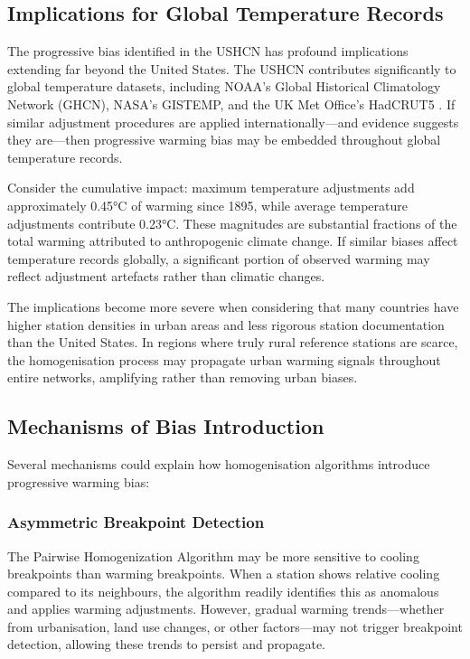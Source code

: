 \documentclass[11pt, a4paper]{article}
\begin{document}
\subsection{Implications for Global Temperature Records}

The progressive bias identified in the USHCN has profound implications extending far beyond the United States. The USHCN contributes significantly to global temperature datasets, including NOAA's Global Historical Climatology Network (GHCN), NASA's GISTEMP, and the UK Met Office's HadCRUT5 \parencite{lenssen2019improvements,morice2021updated}. If similar adjustment procedures are applied internationally—and evidence suggests they are—then progressive warming bias may be embedded throughout global temperature records.

Consider the cumulative impact: maximum temperature adjustments add approximately 0.45°C of warming since 1895, while average temperature adjustments contribute 0.23°C. These magnitudes are substantial fractions of the total warming attributed to anthropogenic climate change. If similar biases affect temperature records globally, a significant portion of observed warming may reflect adjustment artefacts rather than climatic changes.

The implications become more severe when considering that many countries have higher station densities in urban areas and less rigorous station documentation than the United States. In regions where truly rural reference stations are scarce, the homogenisation process may propagate urban warming signals throughout entire networks, amplifying rather than removing urban biases.

\subsection{Mechanisms of Bias Introduction}

Several mechanisms could explain how homogenisation algorithms introduce progressive warming bias:

\subsubsection{Asymmetric Breakpoint Detection}
The Pairwise Homogenization Algorithm may be more sensitive to cooling breakpoints than warming breakpoints. When a station shows relative cooling compared to its neighbours, the algorithm readily identifies this as anomalous and applies warming adjustments. However, gradual warming trends—whether from urbanisation, land use changes, or other factors—may not trigger breakpoint detection, allowing these trends to persist and propagate.
\end{document}

